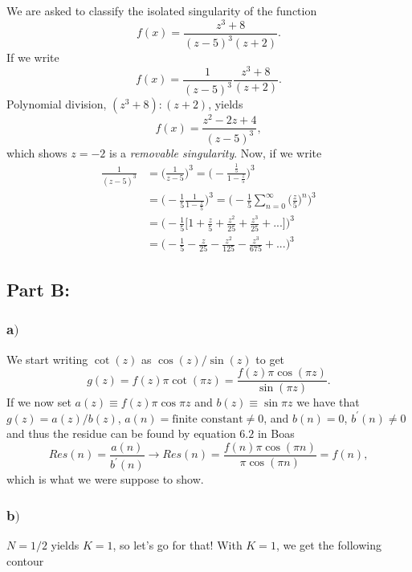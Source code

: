 \documentclass{article}
\begin{document}
We are asked to classify the isolated singularity of the function
\begin{equation}
f(x) = \frac{z^3 + 8}{(z-5)^3(z+2)}.
\end{equation}
If we write
\begin{equation}
f(x) = \frac{1}{(z-5)^3}\frac{z^3+8}{(z+2)}.
\end{equation}
Polynomial division, $(z^3+8):(z+2)$, yields
\begin{equation}
f(x) = \frac{z^2 - 2z + 4}{(z-5)^3},
\end{equation}
which shows $z = -2$ is a \textit{removable singularity}. Now, if we write
\begin{align}
\frac{1}{(z-5)^3} &= \bigg(\frac{1}{z-5}\bigg)^3 = \bigg(-\frac{\frac{1}{5}}{1-\frac{z}{5}}\bigg)^3 \\
 &= \bigg(-\frac{1}{5}\frac{1}{1-\frac{z}{5}}\bigg)^3 = \bigg(-\frac{1}{5}\sum_{n=0}^{\infty}\big(\frac{z}{5}\big)^n\bigg)^3 \\
 &= \bigg(-\frac{1}{5}\bigg[1 + \frac{z}{5} + \frac{z^2}{25} + \frac{z^3}{25} + ... \bigg]\bigg)^3 \\
 &= \bigg(-\frac{1}{5} - \frac{z}{25} - \frac{z^2}{125} - \frac{z^3}{675} + ...\bigg)^3
\end{align}


\subsection*{Part B:}

\subsubsection*{a$)$}
We start writing $\cot{(z)}$ as $\cos{(z)}/\sin{(z)}$ to get
\begin{equation}
g(z) = f(z)\pi\cot{(\pi z)} = \frac{f(z)\pi\cos{(\pi z)}}{\sin{(\pi z)}}.
\end{equation}
If we now set $a(z) \equiv f(z)\pi\cos{\pi z}$ and $b(z) \equiv \sin{\pi z}$ we have that $g(z) = a(z)/b(z)$, $a(n) = \text{finite constant} \neq 0$, and $b(n) = 0$, $b^{'}(n) \neq 0$ and thus the residue can be found by equation $6.2$ in Boas
\begin{equation}
Res(n) = \frac{a(n)}{b^{'}(n)} \rightarrow Res(n) = \frac{f(n)\pi\cos(\pi n)}{\pi\cos(\pi n)} = f(n),
\end{equation}
which is what we were suppose to show.
\subsubsection*{b$)$}
$N = 1/2$ yields $K = 1$, so let's go for that! With $K = 1$, we get the following contour
\end{document}
